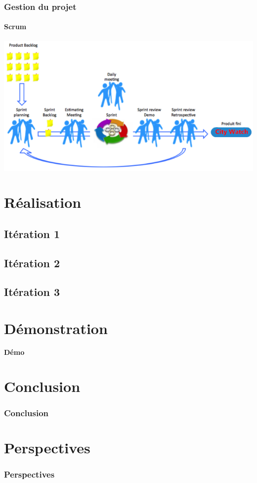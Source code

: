 \documentclass{beamer}
\begin{document}
\begin{frame}
    \frametitle{Gestion du projet}
    \framesubtitle{Scrum}
    \includegraphics{figures/scrum-model.png}
\end{frame}

\section{Réalisation}
\subsection{Itération 1}
\subsection{Itération 2}
\subsection{Itération 3}
\begin{frame}
    \frametitle{}
\end{frame}

\begin{frame}
    \frametitle{}
\end{frame}

\section{Démonstration}
\begin{frame}
    \begin{center}
        \textbf{\Huge Démo}
    \end{center}
\end{frame}

\section{Conclusion}
\begin{frame}
    \frametitle{Conclusion}
\end{frame}

\section{Perspectives}
\begin{frame}
    \frametitle{Perspectives}
\end{frame}
\end{document}
